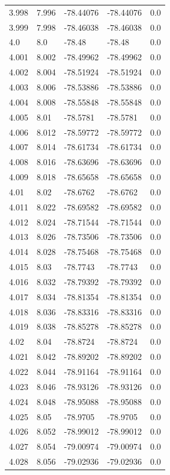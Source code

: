 \begin{tabular}{lllll}
3.998 & 7.996 & -78.44076 & -78.44076 & 0.0 \\
3.999 & 7.998 & -78.46038 & -78.46038 & 0.0 \\
4.0 & 8.0 & -78.48 & -78.48 & 0.0 \\
4.001 & 8.002 & -78.49962 & -78.49962 & 0.0 \\
4.002 & 8.004 & -78.51924 & -78.51924 & 0.0 \\
4.003 & 8.006 & -78.53886 & -78.53886 & 0.0 \\
4.004 & 8.008 & -78.55848 & -78.55848 & 0.0 \\
4.005 & 8.01 & -78.5781 & -78.5781 & 0.0 \\
4.006 & 8.012 & -78.59772 & -78.59772 & 0.0 \\
4.007 & 8.014 & -78.61734 & -78.61734 & 0.0 \\
4.008 & 8.016 & -78.63696 & -78.63696 & 0.0 \\
4.009 & 8.018 & -78.65658 & -78.65658 & 0.0 \\
4.01 & 8.02 & -78.6762 & -78.6762 & 0.0 \\
4.011 & 8.022 & -78.69582 & -78.69582 & 0.0 \\
4.012 & 8.024 & -78.71544 & -78.71544 & 0.0 \\
4.013 & 8.026 & -78.73506 & -78.73506 & 0.0 \\
4.014 & 8.028 & -78.75468 & -78.75468 & 0.0 \\
4.015 & 8.03 & -78.7743 & -78.7743 & 0.0 \\
4.016 & 8.032 & -78.79392 & -78.79392 & 0.0 \\
4.017 & 8.034 & -78.81354 & -78.81354 & 0.0 \\
4.018 & 8.036 & -78.83316 & -78.83316 & 0.0 \\
4.019 & 8.038 & -78.85278 & -78.85278 & 0.0 \\
4.02 & 8.04 & -78.8724 & -78.8724 & 0.0 \\
4.021 & 8.042 & -78.89202 & -78.89202 & 0.0 \\
4.022 & 8.044 & -78.91164 & -78.91164 & 0.0 \\
4.023 & 8.046 & -78.93126 & -78.93126 & 0.0 \\
4.024 & 8.048 & -78.95088 & -78.95088 & 0.0 \\
4.025 & 8.05 & -78.9705 & -78.9705 & 0.0 \\
4.026 & 8.052 & -78.99012 & -78.99012 & 0.0 \\
4.027 & 8.054 & -79.00974 & -79.00974 & 0.0 \\
4.028 & 8.056 & -79.02936 & -79.02936 & 0.0 \\

\end{tabular}
